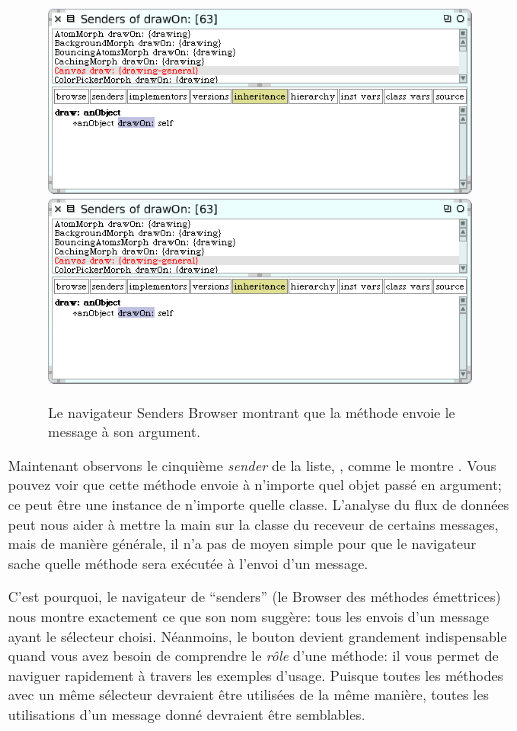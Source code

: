 \documentclass[a4paper,10pt,twoside]{book}
\begin{document}
\begin{figure}[htbp]
	\begin{center}
   \ifluluelse
		{\includegraphics[width=\textwidth]{CanvasDraw}}
		{\includegraphics[scale=0.7]{CanvasDraw}}
	\end{center}
	\caption{Le navigateur Senders Browser montrant que la m\'ethode  envoie le message  \`a son argument.	\label{fig:CanvasDraw}}
\end{figure}

Maintenant observons le cinqui\`eme \emph{sender} de la liste, , comme le montre .
Vous pouvez voir que cette m\'ethode envoie  \`a n'importe quel objet pass\'e en argument; ce peut \^etre une instance de n'importe quelle classe.
L'analyse du flux de donn\'ees peut nous aider \`a mettre la main sur la classe du receveur de certains messages, mais de mani\`ere g\'en\'erale, il n'a pas de moyen simple pour que le navigateur sache quelle m\'ethode sera ex\'ecut\'ee \`a l'envoi d'un message.

C'est pourquoi, le navigateur de ``senders'' (\ie le Browser des m\'ethodes \'emettrices) nous montre exactement ce que son nom sugg\`ere: tous les envois d'un message ayant le s\'electeur choisi.
N\'eanmoins, le bouton  devient grandement indispensable quand vous avez besoin de comprendre le \emph{r\^ole} d'une m\'ethode: il vous permet de naviguer rapidement \`a travers les exemples d'usage.
Puisque toutes les m\'ethodes avec un m\^eme s\'electeur devraient \^etre utilis\'ees de la m\^eme mani\`ere, toutes les utilisations d'un message donn\'e devraient \^etre semblables.
\end{document}
